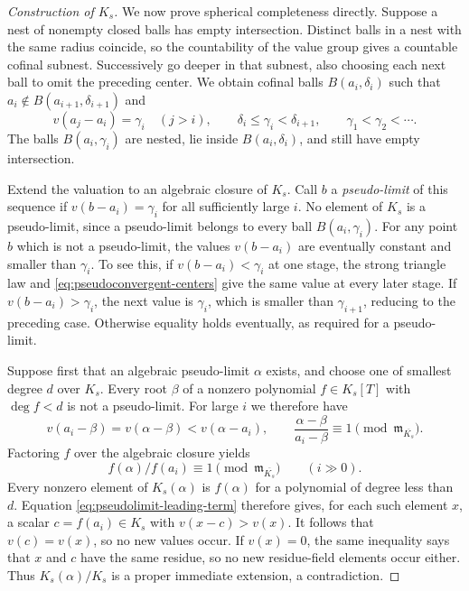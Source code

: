 \begin{proof}[Construction of $K_s$]
We now prove spherical completeness directly.  Suppose a nest of
nonempty closed balls has empty intersection.  Distinct balls in a nest
with the same radius coincide, so the countability of the value group
gives a countable cofinal subnest.  Successively go deeper in that
subnest, also choosing each next ball to omit the preceding center.
We obtain cofinal balls $B(a_i,\delta_i)$ such that
$a_i\notin B(a_{i+1},\delta_{i+1})$ and
\begin{equation}\label{eq:pseudoconvergent-centers}
 v(a_j-a_i)=\gamma_i\quad(j>i),\qquad
 \delta_i\leq\gamma_i<\delta_{i+1},\qquad
 \gamma_1<\gamma_2<\cdots .
\end{equation}
The balls $B(a_i,\gamma_i)$ are nested, lie inside $B(a_i,\delta_i)$,
and still have empty intersection.

Extend the valuation to an algebraic closure of $K_s$.
Call $b$ a \emph{pseudo-limit} of this sequence if
$v(b-a_i)=\gamma_i$ for all sufficiently large $i$.
No element of $K_s$ is a pseudo-limit, since a pseudo-limit belongs to
every ball $B(a_i,\gamma_i)$.
For any point $b$ which is not a pseudo-limit, the values $v(b-a_i)$
are eventually constant and smaller than $\gamma_i$.
To see this, if $v(b-a_i)<\gamma_i$ at one stage, the strong triangle
law and \eqref{eq:pseudoconvergent-centers} give the same value at every
later stage.  If $v(b-a_i)>\gamma_i$, the next value is $\gamma_i$, which
is smaller than $\gamma_{i+1}$, reducing to the preceding case.
Otherwise equality holds eventually, as required for a pseudo-limit.

Suppose first that an algebraic pseudo-limit $\alpha$ exists, and
choose one of smallest degree $d$ over $K_s$.  Every root $\beta$ of a
nonzero polynomial $f\in K_s[T]$ with $\deg f<d$ is not a pseudo-limit.
For large $i$ we therefore have
\[
 v(a_i-\beta)=v(\alpha-\beta)<v(\alpha-a_i),\qquad
 \frac{\alpha-\beta}{a_i-\beta}\equiv1
       \pmod{\mathfrak m_{\overline{K_s}}}.
\]
Factoring $f$ over the algebraic closure yields
\begin{equation}\label{eq:pseudolimit-leading-term}
             f(\alpha)/f(a_i)\equiv1
                    \pmod{\mathfrak m_{\overline{K_s}}}
             \qquad(i\gg0).
\end{equation}
Every nonzero element of $K_s(\alpha)$ is $f(\alpha)$ for a polynomial
of degree less than $d$.  Equation \eqref{eq:pseudolimit-leading-term}
therefore gives, for each such element $x$, a scalar $c=f(a_i)\in K_s$
with $v(x-c)>v(x)$. It follows that $v(c)=v(x)$, so no new values
occur. If $v(x)=0$, the same inequality says that $x$ and $c$ have
the same residue, so no new residue-field elements occur either.
Thus $K_s(\alpha)/K_s$ is a proper immediate extension, a contradiction.


\end{proof}
